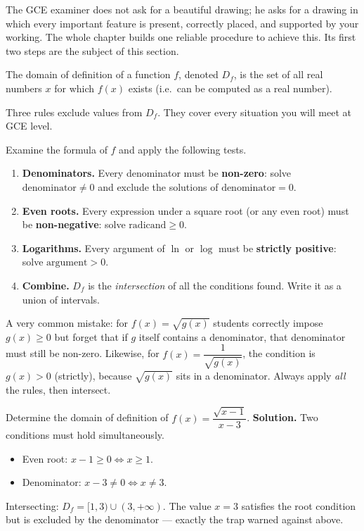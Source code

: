 \documentclass[11pt]{article}
\newcommand{\cle}[1]{{\popxbold\color{popdark}#1}}
\newcounter{popsec}
\newcounter{popsub}
\newcommand{\courssub}[1]{%
  \stepcounter{popsub}%
  \par\vspace{9pt}\noindent{\popxbold\fontsize{11.5}{13}\selectfont\color{popink}{\color{poporange}\thepopsec.\thepopsub}\hspace{6pt}#1}\par\nopagebreak\vspace{4pt}
}
\begin{document}
The GCE examiner does not ask for a beautiful drawing; he asks for a drawing in which every important feature is present, correctly placed, and supported by your working. The whole chapter builds one reliable procedure to achieve this. Its first two steps are the subject of this section.

\courssub{The Domain of Definition}

\begin{definition}
The \cle{domain of definition} of a function $f$, denoted $D_f$, is the set of all real numbers $x$ for which $f(x)$ exists (i.e.\ can be computed as a real number).
\end{definition}

Three rules exclude values from $D_f$. They cover every situation you will meet at GCE level.

\begin{methode}
Examine the formula of $f$ and apply the following tests.
\begin{enumerate}
\item \textbf{Denominators.} Every denominator must be \textbf{non-zero}: solve $\text{denominator} \neq 0$ and exclude the solutions of $\text{denominator} = 0$.
\item \textbf{Even roots.} Every expression under a square root (or any even root) must be \textbf{non-negative}: solve $\text{radicand} \geq 0$.
\item \textbf{Logarithms.} Every argument of $\ln$ or $\log$ must be \textbf{strictly positive}: solve $\text{argument} > 0$.
\item \textbf{Combine.} $D_f$ is the \emph{intersection} of all the conditions found. Write it as a union of intervals.
\end{enumerate}
\end{methode}

\begin{attention}
A very common mistake: for $f(x)=\sqrt{g(x)}$ students correctly impose $g(x)\geq 0$ but forget that if $g$ itself contains a denominator, that denominator must still be non-zero. Likewise, for $f(x)=\dfrac{1}{\sqrt{g(x)}}$, the condition is $g(x)>0$ (strictly), because $\sqrt{g(x)}$ sits in a denominator. Always apply \emph{all} the rules, then intersect.
\end{attention}

\begin{exoresolu}[Domain of $f(x)=\dfrac{\sqrt{x-1}}{x-3}$]
Determine the domain of definition of $f(x)=\dfrac{\sqrt{x-1}}{x-3}$.
\tcblower
\textbf{Solution.} Two conditions must hold simultaneously.
\begin{itemize}
\item Even root: $x-1\geq 0 \iff x\geq 1$.
\item Denominator: $x-3\neq 0 \iff x\neq 3$.
\end{itemize}
Intersecting: $D_f=[1,3)\cup(3,+\infty)$. The value $x=3$ satisfies the root condition but is excluded by the denominator --- exactly the trap warned against above.
\end{exoresolu}
\end{document}

